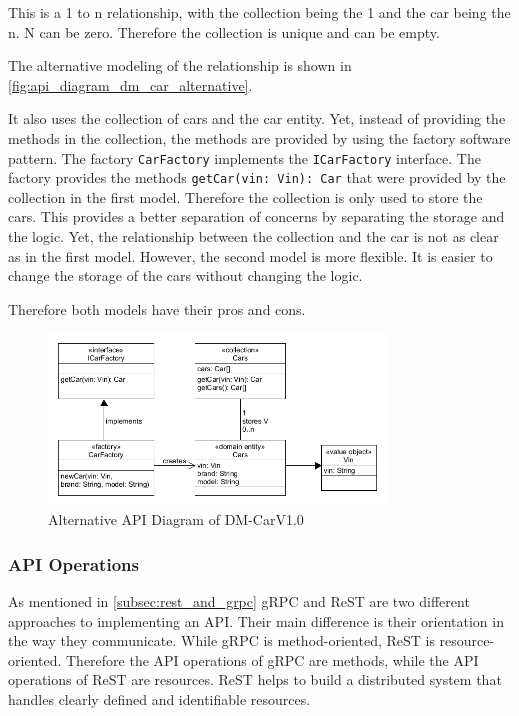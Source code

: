 This is a 1 to n relationship, with the collection being the 1 and the car being the n.
N can be zero.
Therefore the collection is unique and can be empty.

The alternative modeling of the relationship is shown in \autoref{fig:api_diagram_dm_car_alternative}.

It also uses the collection of cars and the car entity.
Yet, instead of providing the methods in the collection, the methods are provided by using the factory software pattern.
The factory \texttt{CarFactory} implements the \texttt{ICarFactory} interface.
The factory provides the methods \texttt{getCar(vin: Vin): Car} that were provided by the collection in the first model.
Therefore the collection is only used to store the cars.
This provides a better separation of concerns by separating the storage and the logic.
Yet, the relationship between the collection and the car is not as clear as in the first model.
However, the second model is more flexible.
It is easier to change the storage of the cars without changing the logic.

Therefore both models have their pros and cons.

\begin{figure}[H]
    \centering
    \includegraphics[width=0.8\textwidth]{figures/microservices/dmCar/apiDiagramDM-CarExtended.png}
    \caption{Alternative API Diagram of DM-CarV1.0}
    \label{fig:api_diagram_dm_car_alternative}
\end{figure}

\subsubsection*{API Operations}
As mentioned in \autoref{subsec:rest_and_grpc} gRPC and ReST are two different approaches to implementing an API.
Their main difference is their orientation in the way they communicate.
While gRPC is method-oriented, ReST is resource-oriented.
Therefore the API operations of gRPC are methods, while the API operations of ReST are resources.
ReST helps to build a distributed system that handles clearly defined and identifiable resources.

